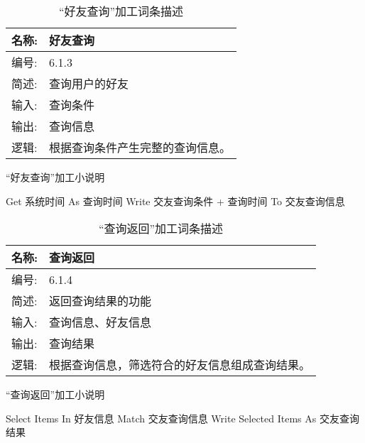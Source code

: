 \begin{table}[H]  
\caption{“好友查询”加工词条描述}  
\begin{center}  
    \begin{tabular}{l p{11cm}} 
        \hline
        \quad 名称:  &   好友查询 \\
        \hline
        \quad 编号:  & 6.1.3 \\
        \hline
        \quad 简述:  & 查询用户的好友 \\
        \hline
        \quad 输入:  & 查询条件 \\
        \hline
        \quad 输出:  & 查询信息\\
        \hline
        \quad 逻辑:  & 根据查询条件产生完整的查询信息。 \\
        \hline
    \end{tabular}
    \label{tab1}
\end{center}
\end{table}

\begin{algorithm}[H] 
    \renewcommand{\thealgorithm}{}
    \caption{“好友查询”加工小说明} 
    \label{alg3} 
    \begin{algorithmic}[1]
        \STATE Get 系统时间 As 查询时间
        \STATE Write 交友查询条件 + 查询时间 To 交友查询信息 
    \end{algorithmic} 
\end{algorithm}


\begin{table}[H]  
\caption{“查询返回”加工词条描述}  
\begin{center}  
    \begin{tabular}{l p{11cm}} 
        \hline
        \quad 名称:  &  查询返回 \\
        \hline
        \quad 编号:  & 6.1.4 \\
        \hline
        \quad 简述:  & 返回查询结果的功能 \\
        \hline
        \quad 输入:  & 查询信息、好友信息 \\
        \hline
        \quad 输出:  & 查询结果\\
        \hline
        \quad 逻辑:  & 根据查询信息，筛选符合的好友信息组成查询结果。 \\
        \hline
    \end{tabular}
    \label{tab1}
\end{center}
\end{table}

\begin{algorithm}[H] 
    \renewcommand{\thealgorithm}{}
    \caption{“查询返回”加工小说明} 
    \label{alg3} 
    \begin{algorithmic}[1]
        \STATE Select Items In 好友信息 Match 交友查询信息
        \STATE Write Selected Items As 交友查询结果
    \end{algorithmic} 
\end{algorithm}